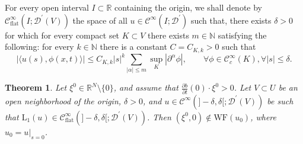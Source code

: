 \documentclass[11pt]{amsart}
\theoremstyle{definition}
\theoremstyle{remark}
\newtheorem{rmk}[defn]{Remark}
\theoremstyle{plain}
\newtheorem{thm}[defn]{Theorem}
\begin{document}
%
%
%
%
For every open interval $I\subset \mathbb{R}$ containing the origin, we shall denote by $\mathcal{C}^\infty_{\text{flat}}(I; \mathcal{D}^\prime(V))$ the space of all $u \in \mathcal{C}^\infty(I; \mathcal{D}^\prime)$ such that, there exists $\delta > 0$ for which for every compact set $K \subset V$ there exists $m \in \mathbb{N}$ satisfying the following: for every $k \in \mathbb{N}$ there is a constant $C = C_{K,k} > 0$ such that
%
\[
	|\langle u(s), \phi(x,t) \rangle| \leq C_{K,k} |s|^k \sum_{|\alpha| \leq m} \sup_{K} |\partial^\alpha \phi|, \qquad \forall \phi \in \mathcal{C}^\infty_c(K), \forall |s| \leq \delta. 
\]	
%
\begin{thm}\label{thm:microlocal_approximate_solution}
	Let $\xi^0 \in \mathbb{R}^N \setminus \{ 0 \}$, and assume that $\frac{\partial b}{\partial t}(0) \cdot \xi^0 > 0$. Let $V\subset U$ be an open neighborhood of the origin, $\delta>0$, and $u \in \mathcal{C}^\infty(]-\delta, \delta[; \mathcal{D}^\prime(V))$ be such that $\mathrm{L}_1(u) \in \mathcal{C}_\text{flat}^\infty(]-\delta, \delta[; \mathcal{D}^\prime(V))$. Then $(\xi^0, 0) \notin \mathrm{WF} (u_0)$, where $u_0 = u|_{s=0}$.
\end{thm}
%
%
\end{document}
